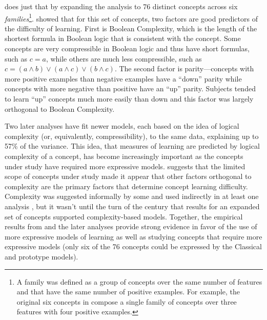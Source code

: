 \documentclass[doc,floatsintext]{apa6}
\begin{document}
\citet{feldman2000} does just that by expanding the analysis to 76 distinct concepts across six \emph{families}\footnote{A family was defined as a group of concepts over the same number of features and that have the same number of positive examples. For example, the original six concepts in \citet{shepardhj1961} compose a single family of concepts over three features with four positive examples.}. \citeauthor{feldman2000} showed that for this set of concepts, two factors are good predictors of the difficulty of learning. First is Boolean Complexity, which is the length of the shortest formula in Boolean logic that is consistent with the concept. Some concepts are very compressible in Boolean logic and thus have short formulas, such as $c = a$, while others are much less compressible, such as $ c = (a \wedge b) \vee (a \wedge c) \vee (b \wedge c) $. The second factor is parity---concepts with more positive examples than negative examples have a ``down'' parity while concepts with more negative than positive have an ``up'' parity. Subjects tended to learn ``up'' concepts much more easily than down and this factor was largely orthogonal to Boolean Complexity.

Two later analyses \citep{goodwinj2011,vigo2009, feldman2006} have fit newer models, each based on the idea of logical complexity (or, equivalently, compressibility), to the same data, explaining up to 57\% of the variance.
This idea, that measures of learning are predicted by logical complexity of a concept, has become increasingly important  as the concepts under study have required more expressive models.
\citet{feldman2000} suggests that the limited scope of concepts under study made it appear that other factors orthogonal to complexity are the primary factors that determine concept learning difficulty. Complexity was suggested informally by some \citep[e.g.][]{shepardhj1961} and used indirectly in at least one analysis \citep{neisserw1962}, but it wasn't until the turn of the century that results for an expanded set of concepts supported complexity-based models.
Together, the  empirical results from \citet{feldman2000} and the later analyses provide strong evidence in favor of the use of more expressive models of learning as well as studying concepts that require more expressive models (only six of the 76 concepts could be expressed by the Classical and prototype models).
\end{document}

